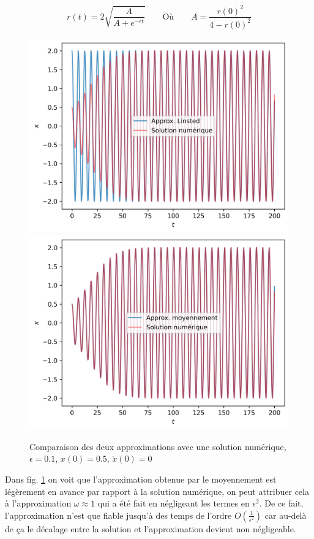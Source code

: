 %
\begin{equation}
    r(t) = 2 \sqrt{ \frac{A}{A + e^{-\epsilon t}} }
    \qquad
    \text{Où}
    \qquad 
    A = \frac{r(0)^2}{4 - r(0)^2}
\end{equation}
%
\begin{figure}
    \centering
    \begin{subcaptionblock}{.90\linewidth}
        \includegraphics[width=.5\linewidth]{images/vdp/vdp_approx_linsted.png}%
        \hfill
        \includegraphics[width=.5\linewidth]{images/vdp/vdp_approx_transient.png}%
    \end{subcaptionblock}
    \caption{Comparaison des deux approximations avec une solution numérique, $\epsilon=0.1$, $x(0)=0.5$, $\dot{x}(0)=0$}
    \label{fig:vdp_approx}
\end{figure}
%
Dans {fig. \ref{fig:vdp_approx}} on voit que l'approximation obtenue par le moyennement est légèrement en avance par rapport à la solution numérique, on peut attribuer cela à l'approximation $\omega \approx 1$ qui a été fait en négligeant les termes en $\epsilon^2$. 
De ce fait, l'approximation n'est que fiable jusqu'à des temps de l'ordre $O\left( \frac{1}{\epsilon^2} \right)$ car au-delà de ça le décalage entre la solution et l'approximation devient non négligeable.
